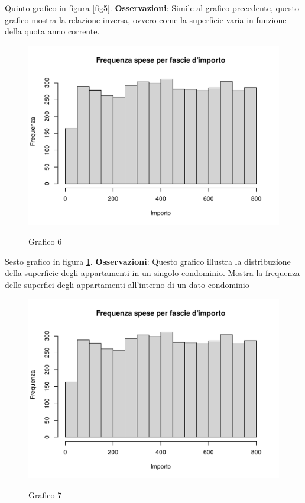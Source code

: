 Quinto grafico in figura \ref{fig5}. \textbf{Osservazioni}: Simile al grafico precedente, questo grafico mostra la relazione inversa, ovvero come la superficie varia in funzione della quota anno corrente.


\clearpage

\begin{figure}[t]
	\caption{Grafico 6}
	\includegraphics[page=6,width=\textwidth]{../R/grafici.pdf}
	\label{fig6}
\end{figure}

Sesto grafico in figura \ref{fig6}. \textbf{Osservazioni}: Questo grafico illustra la distribuzione della superficie degli appartamenti in un singolo condominio. Mostra la frequenza delle superfici degli appartamenti all'interno di un dato condominio


\clearpage

\begin{figure}[t]
	\caption{Grafico 7}
	\includegraphics[page=7,width=\textwidth]{../R/grafici.pdf}
	\label{fig7}
\end{figure}

